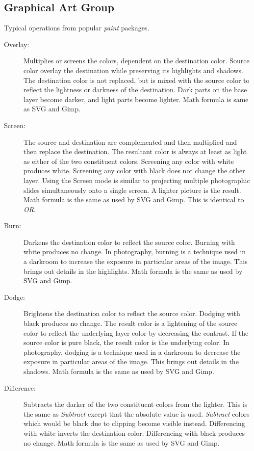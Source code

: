 \subsection*{Graphical Art Group}%
\label{sub:graphical_art_group}

Typical operations from popular \textit{paint} packages.

\begin{description}
    \item[Overlay:] Multiplies or screens the colors, dependent on the destination color. Source color overlay the destination while preserving its highlights and shadows.  The destination color is not replaced, but is mixed with the source color to reflect the lightness or darkness of the destination.  Dark parts on the base layer become darker, and light parts become lighter.  Math formula is same as SVG and Gimp.
    \item[Screen:] The source and destination are complemented and then multiplied and then replace the destination.  The resultant color is always at least as light as either of the two constituent colors.  Screening any color with white produces white.  Screening any color with black does not change the other layer.  Using the Screen mode is similar to projecting multiple photographic slides simultaneously onto a single screen.  A lighter picture is the result.  Math formula is the same as used by SVG and Gimp.  This is identical to \textit{OR}.
    \item[Burn:] Darkens the destination color to reflect the source color.  Burning with white produces no change.  In photography, burning is a technique used in a darkroom to increase the exposure in particular areas of the image.  This brings out details in the highlights.  Math formula is the same as used by SVG and Gimp.
    \item[Dodge:] Brightens the destination color to reflect the source color.  Dodging with black produces no change.  The result color is a lightening of the source color to reflect the underlying layer color by decreasing the contrast.  If the source color is pure black, the result color is the underlying color.  In photography, dodging is a technique used in a darkroom to decrease the exposure in particular areas of the image.  This brings out details in the shadows.  Math formula is the same as used by SVG and Gimp.
    \item[Difference:] Subtracts the darker of the two constituent colors from the lighter.  This is the same as \textit{Subtract} except that the absolute value is used.  \textit{Subtract} colors which would be black due to clipping become visible instead.  Differencing with white inverts the destination color.  Differencing with black produces no change.  Math formula is the same as used by SVG and Gimp.

\end{description}
